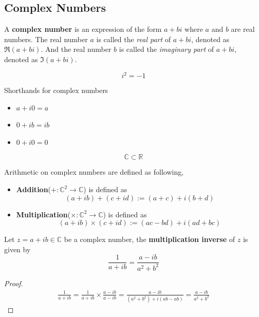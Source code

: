 \documentclass[11pt]{article}
\begin{document}
	\subsection{Complex Numbers}
	\begin{definition}[9.1.3]
		A \textbf{complex number} is an expression of the form $a+bi$ where $a$ and $b$ are real numbers. The real number $a$ is called the \emph{real part} of $a+bi$, denoted as $\Re(a+bi)$. And the real number $b$ is called the \emph{imaginary part} of $a+bi$, denoted as $\Im(a+bi)$.
	\end{definition}
	
	\begin{definition}
		\[
			i^2 = -1
		\]
	\end{definition}
	\begin{remark}
		Shorthands for complex numbers
		\begin{itemize}
			\item $a+i0=a$
			\item $0+ib=ib$
			\item $0+i0=0$
		\end{itemize}
	\end{remark}
	\begin{remark}
		\[
			\mathbb{C} \subset \mathbb{R}
		\]
	\end{remark}
	\begin{definition}
		Arithmetic on complex numbers are defined as following,
		\begin{itemize}
			\item \textbf{Addition}($+: \mathbb{C}^2 \to \mathbb{C}$) is defined as \[(a+ib)+(c+id):=(a+c)+i(b+d)\]
			\item \textbf{Multiplication}($\times: \mathbb{C}^2 \to \mathbb{C}$) is defined as \[(a+ib)\times(c+id):=(ac-bd) + i(ad + bc)\]
		\end{itemize}
	\end{definition}
	\begin{proposition}
		Let $z = a+ib \in \mathbb{C}$ be a complex number, the \textbf{multiplication inverse} of $z$ is given by 
		\[
			\frac{1}{a + ib} = \frac{a - ib}{a^2 + b^2}
		\]
	\end{proposition}
	\begin{proof}
		\begin{gather*}
			\frac{1}{a+ib} = \frac{1}{a+ib} \times \frac{a-ib}{a-ib} = \frac{a-ib}{(a^2 + b^2) + i(ab - ab)} = \frac{a-ib}{a^2 + b^2}
		\end{gather*}
	\end{proof}
	
\end{document}
